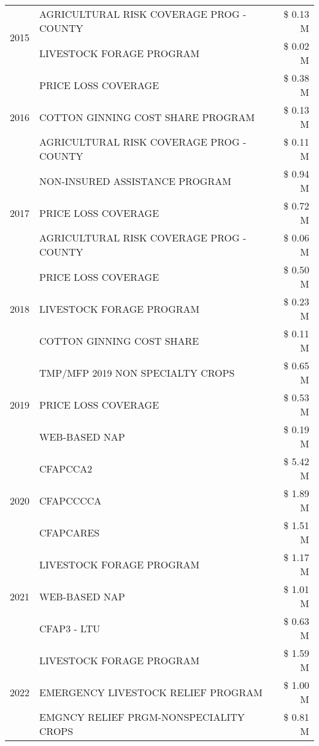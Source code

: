 \begin{tabular}{llr}
\cline{1-3}
\multirow[t]{2}{*}{2015} & AGRICULTURAL RISK COVERAGE PROG - COUNTY & \$ 0.13 M \\
 & LIVESTOCK FORAGE PROGRAM & \$ 0.02 M \\
\cline{1-3}
\multirow[t]{3}{*}{2016} & PRICE LOSS COVERAGE & \$ 0.38 M \\
 & COTTON GINNING COST SHARE PROGRAM & \$ 0.13 M \\
 & AGRICULTURAL RISK COVERAGE PROG - COUNTY & \$ 0.11 M \\
\cline{1-3}
\multirow[t]{3}{*}{2017} & NON-INSURED ASSISTANCE PROGRAM & \$ 0.94 M \\
 & PRICE LOSS COVERAGE & \$ 0.72 M \\
 & AGRICULTURAL RISK COVERAGE PROG - COUNTY & \$ 0.06 M \\
\cline{1-3}
\multirow[t]{3}{*}{2018} & PRICE LOSS COVERAGE & \$ 0.50 M \\
 & LIVESTOCK FORAGE PROGRAM & \$ 0.23 M \\
 & COTTON GINNING COST SHARE & \$ 0.11 M \\
\cline{1-3}
\multirow[t]{3}{*}{2019} & TMP/MFP 2019 NON SPECIALTY CROPS & \$ 0.65 M \\
 & PRICE LOSS COVERAGE & \$ 0.53 M \\
 & WEB-BASED NAP & \$ 0.19 M \\
\cline{1-3}
\multirow[t]{3}{*}{2020} & CFAPCCA2 & \$ 5.42 M \\
 & CFAPCCCCA & \$ 1.89 M \\
 & CFAPCARES & \$ 1.51 M \\
\cline{1-3}
\multirow[t]{3}{*}{2021} & LIVESTOCK FORAGE PROGRAM & \$ 1.17 M \\
 & WEB-BASED NAP & \$ 1.01 M \\
 & CFAP3 - LTU & \$ 0.63 M \\
\cline{1-3}
\multirow[t]{3}{*}{2022} & LIVESTOCK FORAGE PROGRAM & \$ 1.59 M \\
 & EMERGENCY LIVESTOCK RELIEF PROGRAM & \$ 1.00 M \\
 & EMGNCY RELIEF PRGM-NONSPECIALITY CROPS & \$ 0.81 M \\
\cline{1-3}
\bottomrule
\end{tabular}
